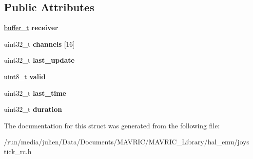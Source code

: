 \subsection*{Public Attributes}
\begin{DoxyCompactItemize}
\item 
\hypertarget{structSpektrum__Receiver_a1da0c88aff4c34ffa5498bdf48469947}{\hyperlink{structbuffer__t}{buffer\+\_\+t} {\bfseries receiver}}\label{structSpektrum__Receiver_a1da0c88aff4c34ffa5498bdf48469947}

\item 
\hypertarget{structSpektrum__Receiver_adbb4f0237d09184334e2db80dc6bbc0e}{uint32\+\_\+t {\bfseries channels} \mbox{[}16\mbox{]}}\label{structSpektrum__Receiver_adbb4f0237d09184334e2db80dc6bbc0e}

\item 
\hypertarget{structSpektrum__Receiver_a48a893158f5c21869c7b498bf1bc6bc1}{uint32\+\_\+t {\bfseries last\+\_\+update}}\label{structSpektrum__Receiver_a48a893158f5c21869c7b498bf1bc6bc1}

\item 
\hypertarget{structSpektrum__Receiver_ad5d4582ed7e96aa90c5be4186e4ff069}{uint8\+\_\+t {\bfseries valid}}\label{structSpektrum__Receiver_ad5d4582ed7e96aa90c5be4186e4ff069}

\item 
\hypertarget{structSpektrum__Receiver_aa9da2a3cae685cde14d7d23705a7fd35}{uint32\+\_\+t {\bfseries last\+\_\+time}}\label{structSpektrum__Receiver_aa9da2a3cae685cde14d7d23705a7fd35}

\item 
\hypertarget{structSpektrum__Receiver_a12c3094ad4950075537ea0af728f052e}{uint32\+\_\+t {\bfseries duration}}\label{structSpektrum__Receiver_a12c3094ad4950075537ea0af728f052e}

\end{DoxyCompactItemize}


The documentation for this struct was generated from the following file\+:\begin{DoxyCompactItemize}
\item 
/run/media/julien/\+Data/\+Documents/\+M\+A\+V\+R\+I\+C/\+M\+A\+V\+R\+I\+C\+\_\+\+Library/hal\+\_\+emu/joystick\+\_\+rc.\+h\end{DoxyCompactItemize}
